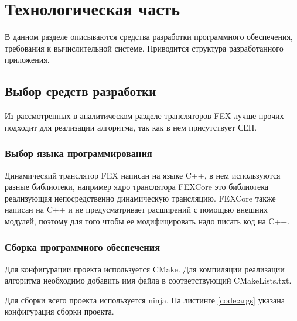 \section{Технологическая часть}

В данном разделе описываются средства разработки программного обеспечения, требования к вычислительной системе. Приводится структура разработанного приложения.

\subsection{Выбор средств разработки}

Из рассмотренных в аналитическом разделе трансляторов FEX лучше прочих подходит для реализации алгоритма, так как в нем присутствует СЕП.

\subsubsection{Выбор языка программирования}

Динамический транслятор FEX написан на языке C++, в нем используются разные библиотеки, например ядро транслятора FEXCore это библиотека реализующая непосредственно динамическую трансляцию. FEXCore также написан на C++ и не предусматривает расширений с помощью внешних модулей, поэтому для того чтобы ее модифицировать надо писать код на C++.

\subsubsection{Сборка программного обеспечения}

Для конфигурации проекта используется CMake. \cite{cmake} Для компиляции реализации алгоритма необходимо добавить имя файла в соответствующий CMakeLists.txt.

Для сборки всего проекта используется ninja. \cite{ninja} На листинге \ref{code:args} указана конфигурация сборки проекта.



